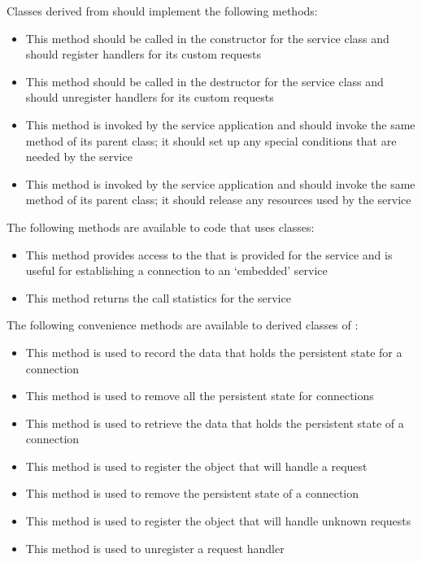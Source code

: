 Classes derived from  should implement the
following methods:
\begin{itemize}
\item \textbf{} This method should be called in the
constructor for the service class and should register handlers for its custom requests
\item \textbf{} This method should be called in the
destructor for the service class and should unregister handlers for its custom requests
\item \textbf{} This method is invoked by the service application and should
invoke the same method of its parent class; it should set up any special conditions that
are needed by the service
\item \textbf{} This method is invoked by the service application and should
invoke the same method of its parent class; it should release any resources used by the
service
\end{itemize}
The following methods are available to code that uses
 classes:
\begin{itemize}
\item \textbf{} This method provides access to the
 that is provided for the service and is useful for
establishing a connection to an `embedded' service
\item \textbf{} This method returns the call statistics for the
service
\end{itemize}
The following convenience methods are available to derived classes of
:
\begin{itemize}
\item \textbf{} This method is used to record the data that holds the
persistent state for a connection
\item \textbf{} This method is used to remove all the persistent
state for connections
\item \textbf{} This method is used to retrieve the data that holds
the persistent state of a connection
\item \textbf{} This method is used to register the
object that will handle a request
\item \textbf{} This method is used to remove the persistent state
of a connection
\item \textbf{} This method is used to register the
object that will handle unknown requests
\item \textbf{} This method is used to unregister a
request handler
\end{itemize}
